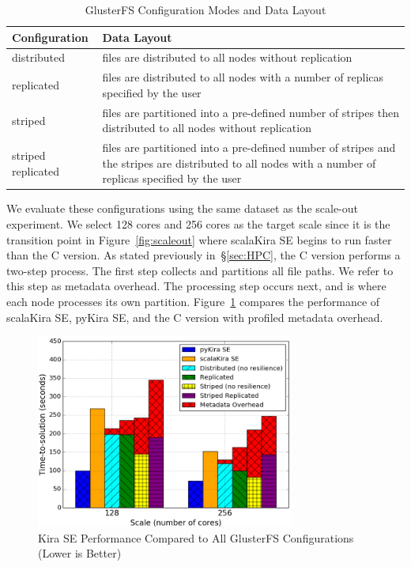 \documentclass[10pt,journal,compsoc]{IEEEtran}
\begin{document}
\begin{table}[h]
  \begin{center}
  \caption{GlusterFS Configuration Modes and Data Layout}
    \begin{small}
    \begin{tabular}{ | p{1.65cm} | p{6cm} |}
    \hline
    Configuration & Data Layout \\ \hline \hline
    distributed & files are distributed to all nodes without replication  \\ \hline
    replicated & files are distributed to all nodes with a number of replicas specified by the user \\ \hline  
    striped & files are partitioned into a pre-defined number of stripes then distributed to all nodes without replication \\ \hline
    striped replicated & files are partitioned into a pre-defined number of stripes and the stripes are distributed to all nodes with a number of replicas specified by the user \\ \hline
    \end{tabular}
    \end{small}   
  \label{tb:gluster-conf}     	
  \end{center}
\end{table}

We evaluate these configurations using the same dataset as the scale-out experiment. We
select 128 cores and 256 cores as the target scale since it is the transition point in
Figure~\ref{fig:scaleout} where scalaKira SE begins to run faster than the C version. 
As stated previously in~\S\ref{sec:HPC}, the C version performs a two-step process. 
The first step collects and partitions all file paths. We refer to this step as metadata overhead. 
The processing step occurs next, and is where each node processes its own partition.
Figure~\ref{fig:allgluster} compares the performance of scalaKira SE, pyKira SE,  and the C version with
profiled metadata overhead.  

\begin{figure}[h]
	\begin{center}
		\includegraphics[width=85mm]{pictures/allgluster}
		\caption{Kira SE Performance Compared to All GlusterFS Configurations (Lower is Better)
		\label{fig:allgluster}}
  	\end{center}
\end{figure}
\end{document}
